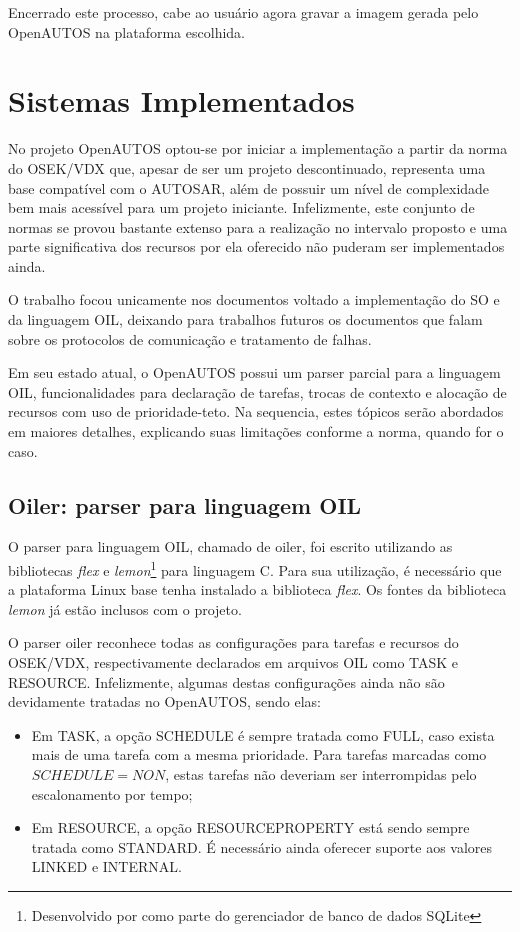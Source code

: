 Encerrado este processo, cabe ao usuário agora gravar a imagem gerada pelo OpenAUTOS na plataforma escolhida.

\section{Sistemas Implementados}

No projeto OpenAUTOS optou-se por iniciar a implementação a partir da norma do OSEK/VDX que, apesar de ser um projeto descontinuado, representa uma base compatível com o AUTOSAR, além de possuir um nível de complexidade bem mais acessível para um projeto iniciante. Infelizmente, este conjunto de normas se provou bastante extenso para a realização no intervalo proposto e uma parte significativa dos recursos por ela oferecido não puderam ser implementados ainda.

O trabalho focou unicamente nos documentos voltado a implementação do SO e da linguagem OIL, deixando para trabalhos futuros os documentos que falam sobre os protocolos de comunicação e tratamento de falhas.

Em seu estado atual, o OpenAUTOS possui um parser parcial para a linguagem OIL, funcionalidades para declaração de tarefas, trocas de contexto e alocação de recursos com uso de prioridade-teto. Na sequencia, estes tópicos serão abordados em maiores detalhes, explicando suas limitações conforme a norma, quando for o caso.

\subsection{Oiler: parser para linguagem OIL} \label{cap:cap4_oiler}

O parser para linguagem OIL, chamado de oiler, foi escrito utilizando as bibliotecas \emph{flex} e \emph{lemon}\footnote{Desenvolvido por  como parte do gerenciador de banco de dados SQLite} para linguagem C. Para sua utilização, é necessário que a plataforma Linux base tenha instalado a biblioteca \emph{flex}. Os fontes da biblioteca \emph{lemon} já estão inclusos com o projeto.

O parser oiler reconhece todas as configurações para tarefas e recursos do OSEK/VDX, respectivamente declarados em arquivos OIL como TASK e RESOURCE. Infelizmente, algumas destas configurações ainda não são devidamente tratadas no OpenAUTOS, sendo elas:

\begin{itemize}
	\item Em TASK, a opção SCHEDULE é sempre tratada como FULL, caso exista mais de uma tarefa com a mesma prioridade. Para tarefas marcadas como $SCHEDULE = NON$, estas tarefas não deveriam ser interrompidas pelo escalonamento por tempo;
	\item Em RESOURCE, a opção RESOURCEPROPERTY está sendo sempre tratada como STANDARD. É necessário ainda oferecer suporte aos valores LINKED e INTERNAL.
\end{itemize}

